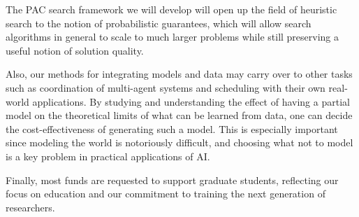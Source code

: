 \documentclass[12pt]{article}
\begin{document}
The PAC search framework we will develop will open up the field of heuristic search to the notion of probabilistic guarantees, which will allow search algorithms in general to scale to much larger problems while still preserving a useful notion of solution quality. 

Also, our methods for integrating models and data may carry over to other tasks such as coordination of multi-agent systems and scheduling with their own real-world applications. By studying and understanding the effect of having a partial model on the theoretical limits of what can be learned from data, one can decide the cost-effectiveness of generating such a model. 
This is especially important since modeling the world is notoriously difficult, and choosing what not to model is a key problem in practical applications of AI. 

Finally, most funds are requested to support graduate students, reflecting our focus on education and our commitment to training the next generation of researchers. 
\end{document}
